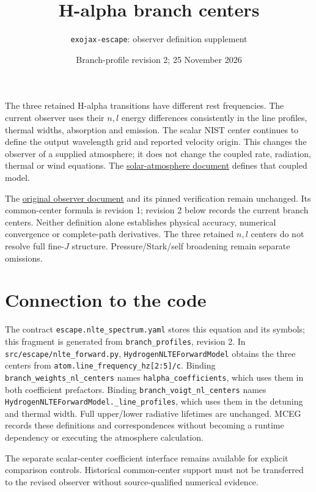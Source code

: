 \documentclass[10pt,a4paper]{article}
\title{H-alpha branch centers}
\author{\texttt{exojax-escape}: observer definition supplement}
\date{Branch-profile revision 2; 25 November 2026}
\begin{document}
\maketitle

The three retained H-alpha transitions have different rest frequencies.
The current observer uses their $n,l$ energy differences consistently in the
line profiles, thermal widths, absorption and emission. The scalar NIST center
continues to define the output wavelength grid and reported velocity origin.
This changes the observer of a supplied atmosphere; it does not change the
coupled rate, radiation, thermal or wind equations. The
\href{solar_atmosphere.pdf}{solar-atmosphere document} defines that coupled model.

The \href{nlte_spectrum.pdf}{original observer document} and its pinned
verification remain unchanged. Its common-center formula is revision 1;
revision 2 below records the current branch centers. Neither definition alone
establishes physical accuracy, numerical convergence or complete-path derivatives.
The three retained $n,l$ centers do not resolve full fine-$J$ structure.
Pressure/Stark/self broadening remain separate omissions.



\section*{Connection to the code}
The contract \texttt{escape.nlte\_spectrum.yaml} stores this equation and its
symbols; this fragment is generated from \texttt{branch\_profiles}, revision 2.
In \texttt{src/escape/nlte\_forward.py},
\texttt{HydrogenNLTEForwardModel} obtains the three centers from
\texttt{atom.line\_frequency\_hz[2:5]/c}.
Binding \texttt{branch\_weights\_nl\_centers} names
\texttt{halpha\_coefficients}, which uses them in both coefficient prefactors.
Binding \texttt{branch\_voigt\_nl\_centers} names
\texttt{HydrogenNLTEForwardModel.\_line\_profiles}, which uses them in the
detuning and thermal width. Full upper/lower radiative lifetimes are unchanged.
MCEG records these definitions and correspondences without becoming a runtime
dependency or executing the atmosphere calculation.

The separate scalar-center coefficient interface remains available for explicit
comparison controls. Historical common-center support must not be transferred
to the revised observer without source-qualified numerical evidence.
\end{document}
